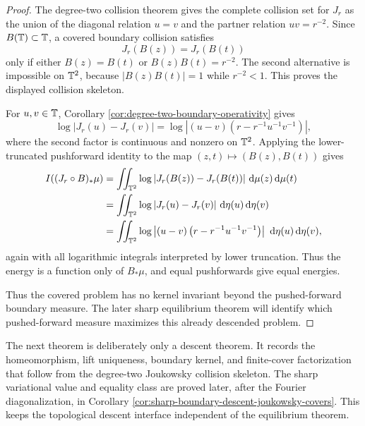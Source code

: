 \begin{proof}
The degree-two collision theorem gives the complete collision set for \(J_r\) as the union of the diagonal relation \(u=v\) and the partner relation \(uv=r^{-2}\).  Since \(B(\mathbb{T})\subset\mathbb{T}\), a covered boundary collision satisfies
\[
J_r(B(z))=J_r(B(t))
\]
only if either \(B(z)=B(t)\) or \(B(z)B(t)=r^{-2}\).  The second alternative is impossible on \(\mathbb{T}^2\), because \(|B(z)B(t)|=1\) while \(r^{-2}<1\).  This proves the displayed collision skeleton.

For \(u,v\in\mathbb{T}\), Corollary \ref{cor:degree-two-boundary-operativity} gives
\[
\log|J_r(u)-J_r(v)|=
\log\left|(u-v)\left(r-r^{-1}u^{-1}v^{-1}\right)\right|,
\]
where the second factor is continuous and nonzero on \(\mathbb{T}^2\).  Applying the lower-truncated pushforward identity to the map \((z,t)\mapsto(B(z),B(t))\) gives
\[
\begin{aligned}
I((J_r\circ B)_\ast\mu)
&=\iint_{\mathbb{T}^2}\log|J_r(B(z))-J_r(B(t))|\,\,\mathrm{d}\mu(z)\,\mathrm{d}\mu(t)\\
&=\iint_{\mathbb{T}^2}\log|J_r(u)-J_r(v)|\,\,\mathrm{d}\eta(u)\,\mathrm{d}\eta(v)\\
&=\iint_{\mathbb{T}^2}
\log\left|(u-v)\left(r-r^{-1}u^{-1}v^{-1}\right)\right|
\,\,\mathrm{d}\eta(u)\,\mathrm{d}\eta(v),
\end{aligned}
\]
again with all logarithmic integrals interpreted by lower truncation.  Thus the energy is a function only of \(B_\ast\mu\), and equal pushforwards give equal energies.

Thus the covered problem has no kernel invariant beyond the pushed-forward boundary measure.  The later sharp equilibrium theorem will identify which pushed-forward measure maximizes this already descended problem.
\end{proof}

The next theorem is deliberately only a descent theorem.  It records the
homeomorphism, lift uniqueness, boundary kernel, and finite-cover
factorization that follow from the degree-two Joukowsky collision
skeleton.  The sharp variational value and equality class are proved
later, after the Fourier diagonalization, in Corollary
\ref{cor:sharp-boundary-descent-joukowsky-covers}.  This keeps the
topological descent interface independent of the equilibrium theorem.

